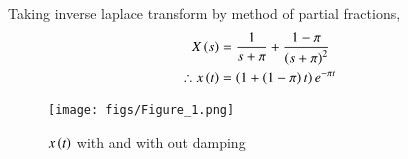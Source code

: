 \documentclass[journal,12pt,twocolumn]{IEEEtran}
\theoremstyle{remark}
\begin{document}
Taking inverse laplace transform by method of partial fractions,
\begin{align}
X\left(s\right) &= \frac{1}{s+\pi} + \frac{1-\pi}{\left(s+\pi\right)^2}\\
\therefore x\left(t\right) &= \left(1+ \left(1-\pi\right)t\right)e^{-\pi t}
\end{align}
\begin{figure}[h!]
    \texttt{[image: figs/Figure\_1.png]}
    \caption{$ x\left(t\right)$ with and with out damping }
    \centering
    \label{fig: nm_63_fig_3}
\end{figure}
\end{document}
